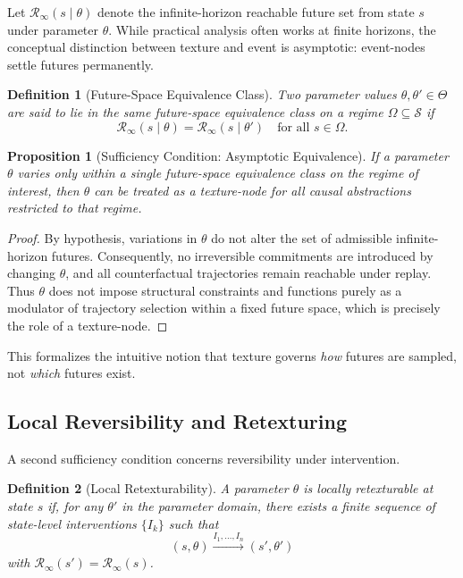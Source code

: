 \documentclass[11pt]{article}
\newtheorem{definition}{Definition}
\newtheorem{proposition}{Proposition}
\newcommand{\State}{\mathcal{S}}
\begin{document}
Let $\mathcal{R}_\infty(s \mid \theta)$ denote the infinite-horizon reachable
future set from state $s$ under parameter $\theta$. While practical analysis
often works at finite horizons, the conceptual distinction between texture and
event is asymptotic: event-nodes settle futures permanently.

\begin{definition}[Future-Space Equivalence Class]
Two parameter values $\theta,\theta' \in \Theta$ are said to lie in the same
\emph{future-space equivalence class} on a regime $\Omega \subseteq \State$ if
\begin{equation}
\mathcal{R}_\infty(s \mid \theta) = \mathcal{R}_\infty(s \mid \theta')
\quad \text{for all } s \in \Omega.
\end{equation}
\end{definition}

\begin{proposition}[Sufficiency Condition: Asymptotic Equivalence]
If a parameter $\theta$ varies only within a single future-space equivalence
class on the regime of interest, then $\theta$ can be treated as a texture-node
for all causal abstractions restricted to that regime.
\end{proposition}

\begin{proof}
By hypothesis, variations in $\theta$ do not alter the set of admissible
infinite-horizon futures. Consequently, no irreversible commitments are
introduced by changing $\theta$, and all counterfactual trajectories remain
reachable under replay. Thus $\theta$ does not impose structural constraints
and functions purely as a modulator of trajectory selection within a fixed
future space, which is precisely the role of a texture-node.
\end{proof}

This formalizes the intuitive notion that texture governs \emph{how} futures are
sampled, not \emph{which} futures exist.

\subsection{Local Reversibility and Retexturing}

A second sufficiency condition concerns reversibility under intervention.

\begin{definition}[Local Retexturability]
A parameter $\theta$ is \emph{locally retexturable} at state $s$ if, for any
$\theta'$ in the parameter domain, there exists a finite sequence of
state-level interventions $\{I_k\}$ such that
\begin{equation}
(s,\theta) \xrightarrow{I_1,\dots,I_n} (s',\theta')
\end{equation}
with $\mathcal{R}_\infty(s') = \mathcal{R}_\infty(s)$.
\end{definition}
\end{document}
